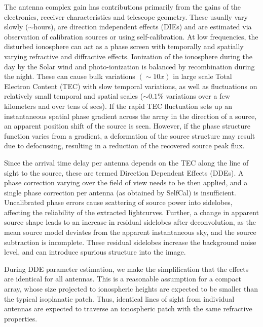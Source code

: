 \documentclass{aa}
\begin{document}
The  antenna complex  gain has  contributions primarily  from the  gains  of the
electronics, receiver characteristics and telescope geometry. These usually vary
slowly ($\sim$hours), are direction independent effects (DIEs) and are estimated
via  observation  of calibration  sources  or  using  self-calibration.  At  low
frequencies, the disturbed ionosphere can  act as a phase screen with temporally
and  spatially varying  refractive and  diffractive effects.  Ionization  of the
ionosphere during the day by the  Solar wind and photo-ionization is balanced by
recombination   during   the   night.    These   can   cause   bulk   variations
$\left(\sim10x\right)$  in large scale  Total Electron  Content (TEC)  with slow
temporal variations,  as well as  fluctuations on relatively small  temporal and
spatial scales  ($\sim0.1\%$ variations  over a few  kilometers and over  tens of
secs).   If the rapid  TEC fluctuation  sets up  an instantaneous  spatial phase
gradient across  the array in  the direction of  a source, an  apparent position
shift of  the source is seen.   However, if the phase  structure function varies
from  a gradient,  a  deformation of  the  source structure  may  result due  to
defocussing, resulting in a reduction of the recovered source peak flux.

Since the arrival  time delay per antenna  depends on the TEC along  the line of
sight  to the source,  these are  termed Direction  Dependent Effects  (DDEs). A
phase correction varying over the field of  view needs to be then applied, and a
single phase  correction per antenna  (as obtained by SelfCal)  is insufficient.
Uncalibrated  phase errors cause scattering of source power into sidelobes,
affecting the reliability  of the extracted lightcurves.  Further,  a change in
apparent  source  shape  leads  to  an  increase  in  residual  sidelobes  after
deconvolution, as the mean source model deviates from the apparent instantaneous
sky, and the source subtraction is incomplete. These residual sidelobes increase
the background noise level, and can introduce spurious structure into the image.


During DDE parameter estimation, we make the simplification that the effects are
identical for all antennas.  This is a reasonable assumption for a compact array,
whose size projected to ionospheric heights  are expected to be smaller than the
typical  isoplanatic  patch. Thus,  identical  lines  of  sight from  individual
antennas are expected to traverse  an ionospheric patch with the same refractive
properties. 
\end{document}
